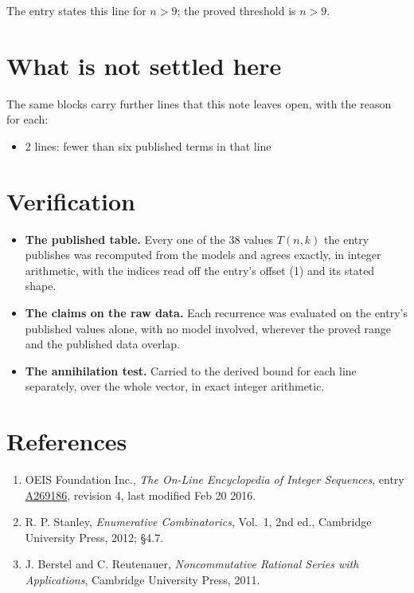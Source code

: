 \documentclass[11pt]{article}
\theoremstyle{definition}
\begin{document}
The entry states this line for $n > 9$; the proved threshold is $n > 9$.

\section{What is not settled here}

The same blocks carry further lines that this note leaves open, with the reason for each:

\begin{itemize}

\item 2 lines: fewer than six published terms in that line

\end{itemize}

\section{Verification}

\begin{itemize}

\item {\bfseries The published table.} Every one of the 38 values $T(n,k)$ the entry publishes was recomputed from the models and agrees exactly, in integer arithmetic, with the indices read off the entry's offset (1) and its stated shape.

\item {\bfseries The claims on the raw data.} Each recurrence was evaluated on the entry's published values alone, with no model involved, wherever the proved range and the published data overlap.

\item {\bfseries The annihilation test.} Carried to the derived bound for each line separately, over the whole vector, in exact integer arithmetic.

\end{itemize}

\section{References}

\begin{enumerate}

\item OEIS Foundation Inc., \emph{The On-Line Encyclopedia of Integer Sequences}, entry \href{https://oeis.org/A269186}{A269186}, revision 4, last modified Feb 20 2016.

\item R. P. Stanley, \emph{Enumerative Combinatorics}, Vol.~1, 2nd ed., Cambridge University Press, 2012; \S4.7.

\item J. Berstel and C. Reutenauer, \emph{Noncommutative Rational Series with Applications}, Cambridge University Press, 2011.

\end{enumerate}
\end{document}
